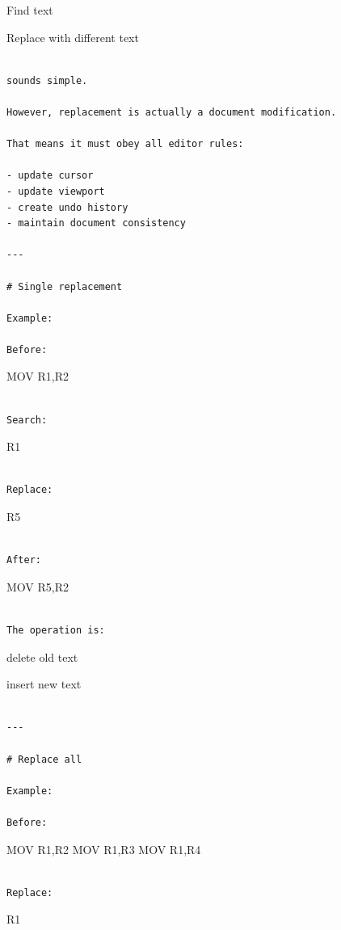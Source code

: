 \documentclass[
  oneside,
  openany]{book}
\begin{document}
Find text

Replace with different text

\begin{verbatim}

sounds simple.

However, replacement is actually a document modification.

That means it must obey all editor rules:

- update cursor
- update viewport
- create undo history
- maintain document consistency

---

# Single replacement

Example:

Before:
\end{verbatim}

MOV R1,R2

\begin{verbatim}

Search:
\end{verbatim}

R1

\begin{verbatim}

Replace:
\end{verbatim}

R5

\begin{verbatim}

After:
\end{verbatim}

MOV R5,R2

\begin{verbatim}

The operation is:
\end{verbatim}

delete old text

insert new text

\begin{verbatim}

---

# Replace all

Example:

Before:
\end{verbatim}

MOV R1,R2 MOV R1,R3 MOV R1,R4

\begin{verbatim}

Replace:
\end{verbatim}

R1
\end{document}
